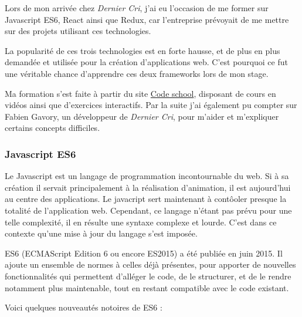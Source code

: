 \bigskip

Lors de mon arrivée chez \emph{Dernier Cri}, j'ai eu l'occasion de me
former sur Javascript ES6, React ainsi que Redux, car l'entreprise
prévoyait de me mettre sur des projets utilisant ces technologies.

\bigskip

La popularité de ces trois technologies est en forte hausse, et de plus
en plus demandée et utilisée pour la création d'applications web. C'est
pourquoi ce fut une véritable chance d'apprendre ces deux frameworks
lors de mon stage.

\bigskip

Ma formation s'est faite à partir du site
\href{https://www.codeschool.com/}{Code school}, disposant de cours en
vidéos ainsi que d'exercices interactifs. Par la suite j'ai également pu
compter sur Fabien Gavory, un développeur de \emph{Dernier Cri}, pour
m'aider et m'expliquer certains concepts difficiles.

\bigskip

\subsubsection{Javascript ES6}\label{javascript-es6}

\bigskip

Le Javascript est un langage de programmation incontournable du web. Si
à sa création il servait principalement à la réalisation d'animation, il
est aujourd'hui au centre des applications. Le javacript sert maintenant
à contôoler presque la totalité de l'application web. Cependant, ce
langage n'étant pas prévu pour une telle complexité, il en résulte une
syntaxe complexe et lourde. C'est dans ce contexte qu'une mise à jour du
langage s'est imposée.

\bigskip

ES6 (ECMAScript Edition 6 ou encore ES2015) a été publiée en juin 2015.
Il ajoute un ensemble de normes à celles déjà présentes, pour apporter
de nouvelles fonctionnalités qui permettent d'alléger le code, de le
structurer, et de le rendre notamment plus maintenable, tout en restant
compatible avec le code existant.

\bigskip

Voici quelques nouveautés notoires de ES6 :

